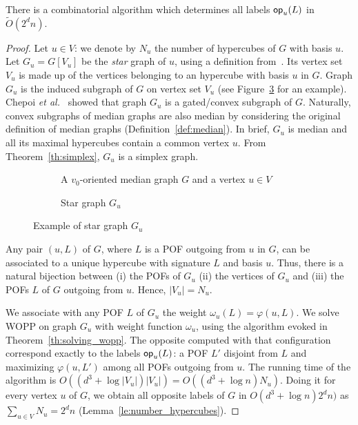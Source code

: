 \documentclass[a4paper,UKenglish,numberwithinsect,cleveref, autoref]{lipics-v2021}
\newcommand{\card}[1]{\left| #1 \right|}
\newcommand{\opp}{\mbox{\textsf{op}}}
\begin{document}
\begin{theorem}[Computation of labels \opp]
There is a combinatorial algorithm which determines all labels $\opp_u(L)$ in $\tilde{O}(2^dn)$. 
\label{th:compute_opp}
\end{theorem}
\begin{proof}
Let $u \in V$: we denote by $N_u$ the number of hypercubes of $G$ with basis $u$. Let $G_u =  G\left[V_u\right]$ be the \textit{star} graph of $u$, using a definition from~\cite{ChLaRa19}. Its vertex set $V_u$ is made up of the vertices belonging to an hypercube with basis $u$ in $G$. Graph $G_u$ is the induced subgraph of $G$ on vertex set $V_u$ (see Figure~\ref{fig:compute_opposites} for an example). Chepoi {\em et al.}~\cite{ChLaRa19} showed that graph $G_u$ is a gated/convex subgraph of $G$. Naturally, convex subgraphs of median graphs are also median by considering the original definition of median graphs (Definition~\ref{def:median}). In brief, $G_u$ is median and all its maximal hypercubes contain a common vertex $u$. From Theorem~\ref{th:simplex}, $G_u$ is a simplex graph.

\begin{figure}[h]
\centering
\begin{subfigure}[b]{0.54\columnwidth}
\centering
\scalebox{0.8}{}
\caption{A $v_0$-oriented median graph $G$ and a vertex $u \in V$}
\label{subfig:compute_opposites_1}
\end{subfigure}
\begin{subfigure}[b]{0.44\columnwidth}
\centering
\scalebox{0.8}{}
\caption{Star graph $G_u$}
\label{subfig:compute_opposites_2}
\end{subfigure}

\caption{Example of star graph $G_u$}
\label{fig:compute_opposites}
\end{figure}

Any pair $(u,L)$ of $G$, where $L$ is a POF outgoing from $u$ in $G$, can be associated to a unique hypercube with signature $L$ and basis $u$. Thus, there is a natural bijection between (i) the POFs of $G_u$ (ii) the vertices of $G_u$ and (iii) the POFs $L$ of $G$ outgoing from $u$. Hence, $\card{V_u} = N_u$.

We associate with any POF $L$ of $G_u$ the weight $\omega_u(L) = \varphi(u,L)$. We solve WOPP on graph $G_u$ with weight function $\omega_u$, using the algorithm evoked in Theorem~\ref{th:solving_wopp}. The opposite computed with that configuration correspond exactly to the labels $\opp_u(L)$: a POF $L'$ disjoint from $L$ and maximizing $\varphi(u,L')$ among all POFs outgoing from $u$. The running time of the algorithm is $O((d^3+\log \card{V_u})\card{V_u}) = O((d^3+\log n)N_u)$. Doing it for every vertex $u$ of $G$, we obtain all opposite labels of $G$ in $O(d^3+\log n)2^dn)$ as $\sum_{u \in V} N_u = 2^dn$ (Lemma~\ref{le:number_hypercubes}).
\end{proof}
\end{document}
